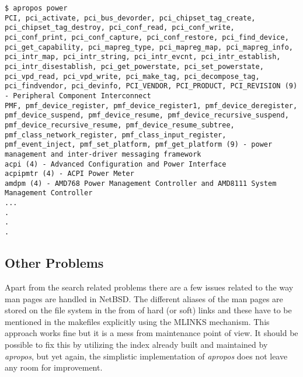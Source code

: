 \documentclass[titlepage, a4paper, 12pt]{article}
\begin{document}
\begin{lstlisting}
$ apropos power
PCI, pci_activate, pci_bus_devorder, pci_chipset_tag_create,
pci_chipset_tag_destroy, pci_conf_read, pci_conf_write,
pci_conf_print, pci_conf_capture, pci_conf_restore, pci_find_device,
pci_get_capability, pci_mapreg_type, pci_mapreg_map, pci_mapreg_info,
pci_intr_map, pci_intr_string, pci_intr_evcnt, pci_intr_establish,
pci_intr_disestablish, pci_get_powerstate, pci_set_powerstate,
pci_vpd_read, pci_vpd_write, pci_make_tag, pci_decompose_tag,
pci_findvendor, pci_devinfo, PCI_VENDOR, PCI_PRODUCT, PCI_REVISION (9)
- Peripheral Component Interconnect
PMF, pmf_device_register, pmf_device_register1, pmf_device_deregister,
pmf_device_suspend, pmf_device_resume, pmf_device_recursive_suspend,
pmf_device_recursive_resume, pmf_device_resume_subtree,
pmf_class_network_register, pmf_class_input_register,
pmf_event_inject, pmf_set_platform, pmf_get_platform (9) - power
management and inter-driver messaging framework
acpi (4) - Advanced Configuration and Power Interface
acpipmtr (4) - ACPI Power Meter
amdpm (4) - AMD768 Power Management Controller and AMD8111 System
Management Controller
...
.
.
.
\end{lstlisting}
\subsection{Other Problems}
Apart from the search related problems there are a few issues related to
the way man pages are handled in NetBSD. The different aliases of the man pages
are stored on the file system in the from of hard (or soft) links and these
have to be mentioned in the makefiles explicitly using the MLINKS mechanism. This
approach works fine but it is a mess from maintenance point of view.
It should be possible to fix this by utilizing the index already built and
maintained by \textit{apropos}, but yet again, the simplistic implementation of
\textit{apropos} does not leave any room for improvement.
\end{document}
